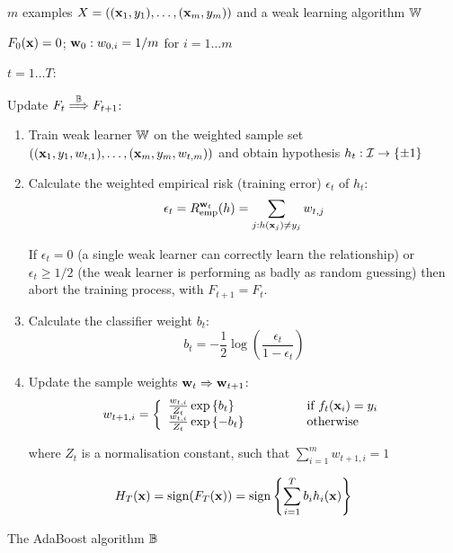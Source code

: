 \begin{linefigure}
\label{fig:boosting algorithm}
 $m$ examples $X = ((\mathbf{x}_1, y_1), \ldots, (\mathbf{x}_m,
y_m))$ and a weak learning algorithm $\mathbb{W}$
\par
{} $F_0(\mathbf{x}) = 0$; $\mathbf{w}_0 : w_{0,i} = 1/m$ for
$i=1 \ldots m$ 
\par
{} $t=1 \ldots T$:
\par
\noindent Update $F_t \stackrel{\mathbb{B}}{\Longrightarrow} F_{t+1}$: 
\par
\begin{enumerate}

\item	Train weak learner $\mathbb{W}$ on the weighted sample set 
	$((\mathbf{x}_1, y_1, w_{t,1}), \ldots, (\mathbf{x}_m, y_m, w_{t,m}))$
	and obtain hypothesis $h_t : \mathcal{I} \rightarrow \{\pm 1\}$

\item	Calculate the weighted empirical risk (training error)
	$\epsilon_t$ of $h_t$: 
	\begin{equation}
	\epsilon_t = R_{\mathrm{emp}}^{\mathbf{w}_t}(h) = \sum_{j : h(\mathbf{x}_j) \neq
	y_j} w_{t,j}
	\end{equation}

	If $\epsilon_t = 0$ (a single weak learner can correctly learn
	the relationship) or $\epsilon_t \geq 1/2$ (the weak
	learner is performing as badly as random guessing) then abort
	the training process, with $F_{t+1} = F_{t}$.

\item	Calculate the classifier weight $b_t$:
	\begin{equation}
	b_t = - \frac{1}{2} \log \left( \frac{\epsilon_t}{1 -
	\epsilon_t} \right)
	\end{equation}

\item	Update the sample weights $\mathbf{w}_t \Rightarrow \mathbf{w}_{t+1}$:
	\begin{equation}
	w_{t+1, i} = \left\{
	\begin{array}{ll}
		\frac{w_{t, i}}{Z_t} \exp \left\{ b_t \right\}&	\qquad
		\qquad \mbox{if  $f_t(\mathbf{x}_i) = y_i$} \\
		\frac{w_{t, i}}{Z_t} \exp \left\{ -b_t \right\} & \qquad \qquad
		\mbox{otherwise} \\
	\end{array} \right.
	\label{eqn:sample weight update}
	\end{equation}

	where $Z_t$ is a normalisation constant, such that
	$\sum_{i=1}^{m} w_{t+1, i} = 1$
\end{enumerate}

\par
{} 
\begin{equation}
H_T(\mathbf{x}) = \mathrm{sign} (F_T(\mathbf{x})) = \mathrm{sign} \left\{ \sum_{i=1}^T b_i
h_i(\mathbf{x}) \right\} 
\end{equation}
\caption{The AdaBoost algorithm $\mathbb{B}$}
\end{linefigure}

